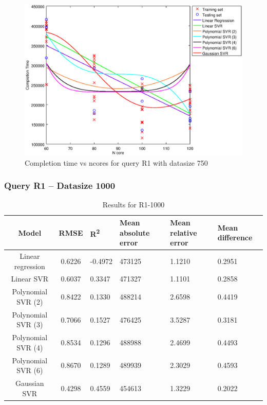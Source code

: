 \documentclass[a4paper,11pt]{article}
\begin{document}
\begin {figure}[hbtp]
\centering
\includegraphics[width=\textwidth]{output/R1_750_ONLY_1_LINEAR_NCORE/plot_R1_750.eps}
\caption{Completion time vs ncores for query R1 with datasize 750}
\label{fig:coreonly_linear_R1_750}
\end {figure}

\newpage
\subsubsection{Query R1 -- Datasize 1000}
\begin{table}[H]
	\centering
	\begin{adjustbox}{center}
		\begin{tabular}{c | c M{1.2cm} M{2.5cm} M{2.5cm} M{1.8cm}}
			Model & RMSE & R\textsuperscript{2} & Mean absolute error & Mean relative error & Mean difference \tabularnewline
			\hline
			Linear regression & 0.6226 & -0.4972 & 473125 & 1.1210 & 0.2951 \\
			Linear SVR & 0.6037 & 0.3347 & 471327 & 1.1101 & 0.2858 \\
			Polynomial SVR (2) & 0.8422 & 0.1330 & 488214 & 2.6598 & 0.4419 \\
			Polynomial SVR (3) & 0.7066 & 0.1527 & 476425 & 3.5287 & 0.3181 \\
			Polynomial SVR (4) & 0.8534 & 0.1296 & 488988 & 2.4699 & 0.4493 \\
			Polynomial SVR (6) & 0.8670 & 0.1289 & 489939 & 2.3029 & 0.4593 \\
			Gaussian SVR & 0.4298 & 0.4559 & 454613 & 1.3229 & 0.2022 \\
		\end{tabular}
	\end{adjustbox}
	\\
	\caption{Results for R1-1000}
	\label{fig:coreonly_linear_R1_1000}
\end{table}
\end{document}
